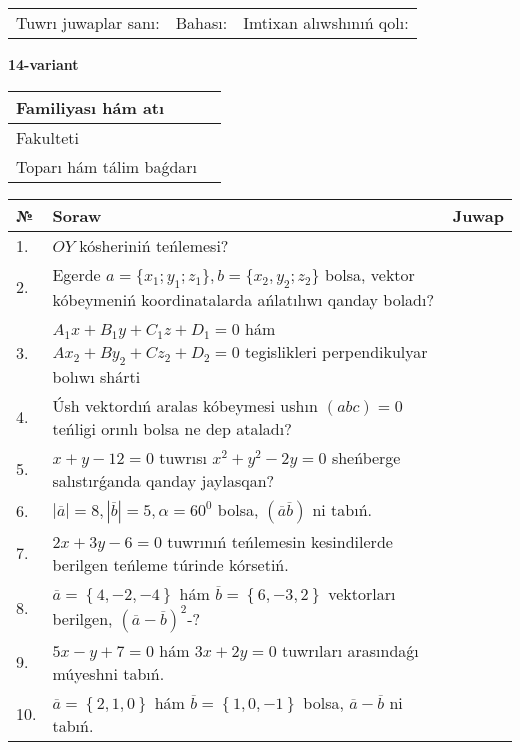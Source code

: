 \documentclass{article}
\begin{document}
\vspace{1cm}

\begin{tabular}{lll}
Tuwrı juwaplar sanı: \underline{\hspace{1.5cm}} & 
Bahası: \underline{\hspace{1.5cm}} & 
Imtixan alıwshınıń qolı: \underline{\hspace{2cm}} \\
\end{tabular}

\egroup

\newpage


\textbf{14-variant}\\

\bgroup
\def\arraystretch{1.6} %

\begin{tabular}{|m{5.7cm}|m{9.5cm}|}
\hline
Familiyası hám atı & \\
\hline
Fakulteti  & \\
\hline
Toparı hám tálim baǵdarı  & \\
\hline
\end{tabular}

\vspace{1cm}

\begin{tabular}{|m{0.7cm}|m{10cm}|m{4cm}|}
\hline
№ & Soraw & Juwap \\
\hline
1. & $OY$ kósheriniń teńlemesi? &  \\
\hline
2. & Egerde $a=\{ x_1; y_1; z_1\}, b=\{ x_2, y_2; z_2\}$ bolsa, vektor kóbeymeniń koordinatalarda ańlatılıwı qanday boladı? &  \\
\hline
3. & $A_1x+B_1y+C_1z+D_1=0$ hám $Ax_2+By_2+Cz_2+D_2=0$ tegislikleri perpendikulyar bolıwı shárti &  \\
\hline
4. & Úsh vektordıń aralas kóbeymesi ushın $(abc)=0$ teńligi orınlı bolsa ne dep ataladı? &  \\
\hline
5. & $x+y-12=0$ tuwrısı $x^{2}+y^{2}-2y=0$ sheńberge salıstırǵanda qanday jaylasqan? &  \\
\hline
6. & $\left| \overline{a} \right|=8, \left| \overline{b} \right|=5, \alpha=60^{0}$ bolsa, $( \overline{a}\overline{b} )$ ni tabıń. &  \\
\hline
7. & $2x+3y-6=0$ tuwrınıń teńlemesin kesindilerde berilgen teńleme túrinde kórsetiń. &  \\
\hline
8. & $\overline{a}=\left\{ 4,-2,-4 \right\}$ hám $\overline{b}=\left\{ 6,-3, 2 \right\}$ vektorları berilgen, $(\overline{a}-\overline{b}) ^{2}$-? &  \\
\hline
9. & $5x-y+7=0$ hám $3x+2y=0$ tuwrıları arasındaǵı múyeshni tabıń. &  \\
\hline
10. & $\overline{a}=\left\{ 2, 1, 0 \right\}$ hám $\overline{b}=\left\{ 1, 0,-1 \right\}$ bolsa, $\overline{a}-\overline{b}$ ni tabıń. &  \\
\hline
\end{tabular}
\end{document}
